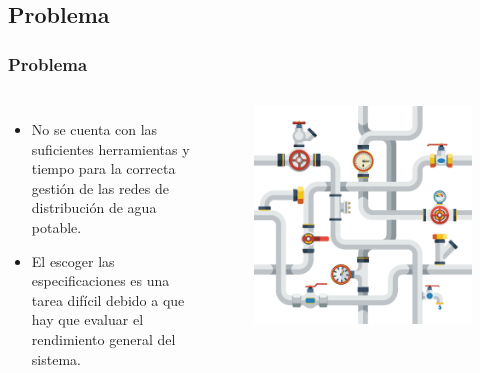 \documentclass[9pt]{beamer}
\begin{document}
    \subsection{Problema}
    \begin{frame}
        \frametitle{Problema}
        
        \begin{columns}
            \begin{itemize}
                \justifying
                \item No se cuenta con las suficientes herramientas y tiempo para la correcta gestión de las redes de distribución de agua potable.
                \item El escoger las especificaciones es una tarea difícil debido a que hay que evaluar el rendimiento general del sistema.
            \end{itemize}

            \begin{figure}
                \includegraphics[width=\textwidth]{assets/Relleno/pipes.eps}
            \end{figure}
        \end{columns}
    \end{frame}
\end{document}
